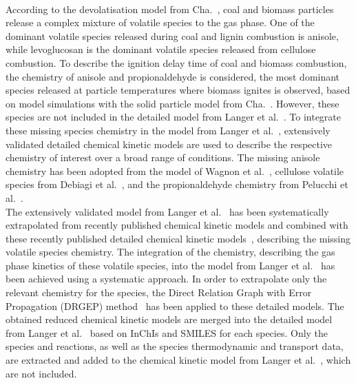 \begin{refsection}
\begin{figure}[h]
  \label{fig:B1bKineticModelDevelopmentStructure}
\end{figure}
\\
According to the devolatisation model from Cha.~, coal and biomass particles release a complex mixture of volatile species to the gas phase. One of the dominant volatile species released during coal and lignin combustion is anisole, while levoglucosan is the dominant volatile species released from cellulose combustion. To describe the ignition delay time of coal and biomass combustion, the chemistry of anisole and propionaldehyde is considered, the most dominant species released at particle temperatures where biomass ignites is observed, based on model simulations with the solid particle model from Cha.~. However, these species are not included in the detailed model from Langer et al.~\cite{Langer2023}. To integrate these missing species chemistry in the model from Langer et al.~\cite{Langer2023}, extensively validated detailed chemical kinetic models are used to describe the respective chemistry of interest over a broad range of conditions. The missing anisole chemistry has been adopted from the model of Wagnon et al.~\cite{Wagnon2018}, cellulose volatile species from Debiagi et al.~\cite{Debiagi2016}, and the propionaldehyde chemistry from Pelucchi et al.~\cite{Pelucchi2015}.
\\
The extensively validated model from Langer et al.~\cite{Langer2023} has been systematically extrapolated from recently published chemical kinetic models and combined with these recently published detailed chemical kinetic models~\cite{Wagnon2018, Debiagi2016, Pelucchi2015}, describing the missing volatile species chemistry. The integration of the chemistry, describing the gas phase kinetics of these volatile species, into the model from Langer et al.~\cite{Langer2023} has been achieved using a systematic approach. In order to extrapolate only the relevant chemistry for the species, the Direct Relation Graph with Error Propagation (DRGEP) method~\cite{PepiotDesjardins2008a} has been applied to these detailed models. The obtained reduced chemical kinetic models are merged into the detailed model from Langer et al.~\cite{Langer2023} based on InChIs and SMILES for each species. Only the species and reactions, as well as the species thermodynamic and transport data, are extracted and added to the chemical kinetic model from Langer et al.~\cite{Langer2023}, which are not included.
\\

\end{refsection}

